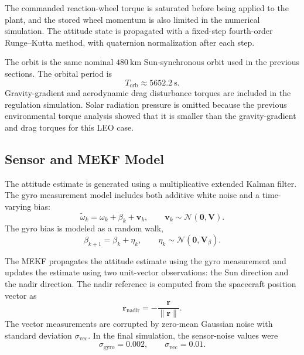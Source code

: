 The commanded reaction-wheel torque is saturated before being applied to the plant,
and the stored wheel momentum is also limited in the numerical simulation. The attitude
state is propagated with a fixed-step fourth-order Runge--Kutta method, with quaternion
normalization after each step.

The orbit is the same nominal \(480~\mathrm{km}\) Sun-synchronous orbit used in the
previous sections. The orbital period is
\begin{equation}
    T_{\mathrm{orb}} \approx 5652.2~\mathrm{s}.
\end{equation}
Gravity-gradient and aerodynamic drag disturbance torques are included in the
regulation simulation. Solar radiation pressure is omitted because the previous
environmental torque analysis showed that it is smaller than the gravity-gradient
and drag torques for this LEO case.

\subsection{Sensor and MEKF Model}

The attitude estimate is generated using a multiplicative extended Kalman filter.
The gyro measurement model includes both additive white noise and a time-varying
bias:
\begin{equation}
    \tilde{\omega}_k
    =
    \omega_k
    +
    \beta_k
    +
    \mathbf v_k,
    \qquad
    \mathbf v_k \sim \mathcal{N}(\mathbf 0,\mathbf V).
\end{equation}
The gyro bias is modeled as a random walk,
\begin{equation}
    \beta_{k+1}
    =
    \beta_k
    +
    \eta_k,
    \qquad
    \eta_k \sim \mathcal{N}(\mathbf 0,\mathbf V_\beta).
\end{equation}

The MEKF propagates the attitude estimate using the gyro measurement and updates the
estimate using two unit-vector observations: the Sun direction and the nadir direction.
The nadir reference is computed from the spacecraft position vector as
\begin{equation}
    \mathbf r_{\mathrm{nadir}}
    =
    -\frac{\mathbf r}{\|\mathbf r\|}.
\end{equation}
The vector measurements are corrupted by zero-mean Gaussian noise with standard
deviation \(\sigma_{\mathrm{vec}}\). In the final simulation, the sensor-noise values
were
\begin{equation}
    \sigma_{\mathrm{gyro}} = 0.002,
    \qquad
    \sigma_{\mathrm{vec}} = 0.01.
\end{equation}

